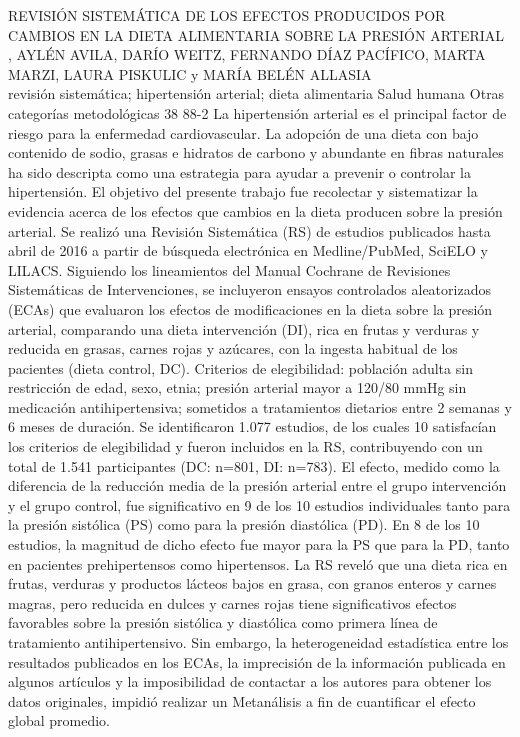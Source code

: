 \A
{REVISIÓN SISTEMÁTICA DE LOS EFECTOS PRODUCIDOS POR CAMBIOS EN LA DIETA ALIMENTARIA SOBRE LA PRESIÓN ARTERIAL}
{, AYLÉN AVILA, DARÍO WEITZ, FERNANDO DÍAZ PACÍFICO, MARTA MARZI, LAURA PISKULIC y MARÍA BELÉN ALLASIA}
{
\\}
{revisión sistemática; hipertensión arterial; dieta alimentaria} 
 {Salud humana} 
 {Otras categorías metodológicas} 
 {38} 
 {88-2}
{La hipertensión arterial es el principal factor de riesgo para la enfermedad cardiovascular. La adopción de una dieta con bajo contenido de sodio, grasas e hidratos de carbono y abundante en fibras naturales ha sido descripta como una estrategia para ayudar a prevenir o controlar la hipertensión. El objetivo del presente trabajo fue recolectar y sistematizar la evidencia acerca de los efectos que cambios en la dieta producen sobre la presión arterial. Se realizó una Revisión Sistemática (RS) de estudios publicados hasta abril de 2016 a partir de búsqueda electrónica en Medline/PubMed, SciELO y LILACS. Siguiendo los lineamientos del Manual Cochrane de Revisiones Sistemáticas de Intervenciones, se incluyeron ensayos controlados aleatorizados (ECAs) que evaluaron los efectos de modificaciones en la dieta sobre la presión arterial, comparando una dieta intervención (DI), rica en frutas y verduras y reducida en grasas, carnes rojas y azúcares, con la ingesta habitual de los pacientes (dieta control, DC). Criterios de elegibilidad: población adulta sin restricción de edad, sexo, etnia; presión arterial mayor a 120/80 mmHg sin medicación antihipertensiva; sometidos a tratamientos dietarios entre 2 semanas y 6 meses de duración. Se identificaron 1.077 estudios, de los cuales 10 satisfacían los criterios de elegibilidad y fueron incluidos en la RS, contribuyendo con un total de 1.541 participantes (DC: n=801, DI: n=783). El efecto, medido como la diferencia de la reducción media de la presión arterial entre el grupo intervención y el grupo control, fue significativo en 9 de los 10 estudios individuales tanto para la presión sistólica (PS) como para la presión diastólica (PD). En 8 de los 10 estudios, la magnitud de dicho efecto fue mayor para la PS que para la PD, tanto en pacientes prehipertensos como hipertensos. La RS reveló que una dieta rica en frutas, verduras y productos lácteos bajos en grasa, con granos enteros y carnes magras, pero reducida en dulces y carnes rojas tiene significativos efectos favorables sobre la presión sistólica y diastólica como primera línea de tratamiento antihipertensivo. Sin embargo, la heterogeneidad estadística entre los resultados publicados en los ECAs, la imprecisión de la información publicada en algunos artículos y la imposibilidad de contactar a los autores para obtener los datos originales, impidió realizar un Metanálisis a fin de cuantificar el efecto global promedio.}

